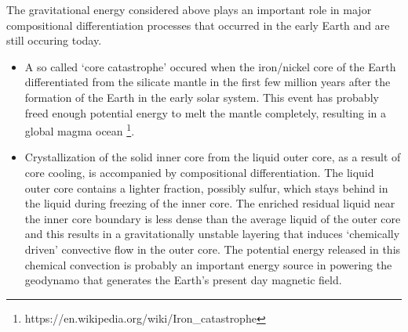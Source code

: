 \vspace{0.5cm}


The gravitational energy considered above plays an important role
in major compositional differentiation processes that occurred 
in the early Earth and are still occuring today.
\begin{itemize}
\item
  A so called `core catastrophe' occured when
  the iron/nickel core of the Earth differentiated from the silicate mantle
  in the first few million years after the formation of the Earth
  in the early solar system.
  This event has probably freed enough potential energy to melt the mantle 
  completely, resulting in a global magma ocean \footnote{https://en.wikipedia.org/wiki/Iron\_catastrophe}.
\item
  Crystallization of the solid inner core from the liquid outer core,
  as a result of core cooling,
  is accompanied by compositional differentiation. 
  The liquid outer core contains a lighter fraction, possibly sulfur,
  which stays behind in the liquid during freezing of the inner
  core.
  The enriched residual liquid near the inner core boundary is less
  dense than the average liquid of the outer core and this results
  in a gravitationally unstable layering that induces
  `chemically driven' convective flow in the outer core.
  The potential energy released in this chemical convection is 
  probably an important energy source in powering the geodynamo
  that generates the Earth's present day magnetic field.
\end{itemize}
